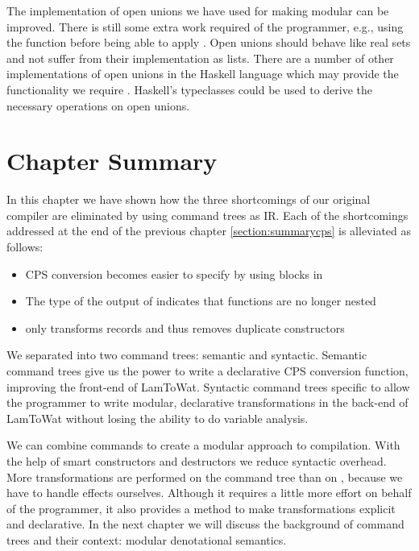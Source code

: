 The implementation of open unions we have used for making  modular can be improved. There is still some extra work required of the programmer, e.g., using the function  before being able to apply . Open unions should behave like real sets and not suffer from their implementation as lists. There are a number of other implementations of open unions in the Haskell language which may provide the functionality we require \autocite{extensible-effects, open-union}. Haskell's typeclasses could be used to derive the necessary operations on open unions.

\section{\label{section:summarytree}Chapter Summary}
In this chapter we have shown how the three shortcomings of our original compiler are eliminated by using command trees as IR. Each of the shortcomings addressed at the end of the previous chapter \ref{section:summarycps} is alleviated as follows: 

\begin{itemize}
\item CPS conversion becomes easier to specify by using blocks in 
\item The type of the output of  indicates that functions are no longer nested
\item {} only transforms records and thus removes duplicate constructors
\end{itemize}

We separated  into two command trees: semantic and syntactic. Semantic command trees give us the power to write a declarative CPS conversion function, improving the front-end of LamToWat. Syntactic command trees specific to  allow the programmer to write modular, declarative transformations in the back-end of LamToWat without losing the ability to do variable analysis.

We can combine commands to create a modular approach to compilation. With the help of smart constructors and destructors we reduce syntactic overhead. More transformations are performed on the command tree than on , because we have to handle effects ourselves. Although it requires a little more effort on behalf of the programmer, it also provides a method to make transformations explicit and declarative. In the next chapter we will discuss the background of command trees and their context: modular denotational semantics.
